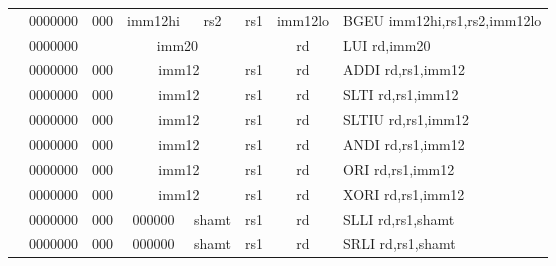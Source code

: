 \begin{table}[p]
\begin{small}
\begin{center}
\begin{tabular}{rcccccccccl}
&
\multicolumn{1}{|c|}{0000000} &
\multicolumn{2}{c|}{000} &
\multicolumn{3}{c|}{imm12hi} &
\multicolumn{1}{c|}{rs2} &
\multicolumn{1}{c|}{rs1} &
\multicolumn{1}{c|}{imm12lo} & BGEU imm12hi,rs1,rs2,imm12lo \\
\cline{2-10}
  

&
\multicolumn{1}{|c|}{0000000} &
\multicolumn{7}{c|}{imm20} &
\multicolumn{1}{c|}{rd} & LUI rd,imm20 \\
\cline{2-10}
  

&
\multicolumn{1}{|c|}{0000000} &
\multicolumn{2}{c|}{000} &
\multicolumn{4}{c|}{imm12} &
\multicolumn{1}{c|}{rs1} &
\multicolumn{1}{c|}{rd} & ADDI rd,rs1,imm12 \\
\cline{2-10}
  

&
\multicolumn{1}{|c|}{0000000} &
\multicolumn{2}{c|}{000} &
\multicolumn{4}{c|}{imm12} &
\multicolumn{1}{c|}{rs1} &
\multicolumn{1}{c|}{rd} & SLTI rd,rs1,imm12 \\
\cline{2-10}
  

&
\multicolumn{1}{|c|}{0000000} &
\multicolumn{2}{c|}{000} &
\multicolumn{4}{c|}{imm12} &
\multicolumn{1}{c|}{rs1} &
\multicolumn{1}{c|}{rd} & SLTIU rd,rs1,imm12 \\
\cline{2-10}
  

&
\multicolumn{1}{|c|}{0000000} &
\multicolumn{2}{c|}{000} &
\multicolumn{4}{c|}{imm12} &
\multicolumn{1}{c|}{rs1} &
\multicolumn{1}{c|}{rd} & ANDI rd,rs1,imm12 \\
\cline{2-10}
  

&
\multicolumn{1}{|c|}{0000000} &
\multicolumn{2}{c|}{000} &
\multicolumn{4}{c|}{imm12} &
\multicolumn{1}{c|}{rs1} &
\multicolumn{1}{c|}{rd} & ORI rd,rs1,imm12 \\
\cline{2-10}
  

&
\multicolumn{1}{|c|}{0000000} &
\multicolumn{2}{c|}{000} &
\multicolumn{4}{c|}{imm12} &
\multicolumn{1}{c|}{rs1} &
\multicolumn{1}{c|}{rd} & XORI rd,rs1,imm12 \\
\cline{2-10}
  

&
\multicolumn{1}{|c|}{0000000} &
\multicolumn{2}{c|}{000} &
\multicolumn{2}{c|}{000000} &
\multicolumn{2}{c|}{shamt} &
\multicolumn{1}{c|}{rs1} &
\multicolumn{1}{c|}{rd} & SLLI rd,rs1,shamt \\
\cline{2-10}
  

&
\multicolumn{1}{|c|}{0000000} &
\multicolumn{2}{c|}{000} &
\multicolumn{2}{c|}{000000} &
\multicolumn{2}{c|}{shamt} &
\multicolumn{1}{c|}{rs1} &
\multicolumn{1}{c|}{rd} & SRLI rd,rs1,shamt \\
\cline{2-10}
  


\end{tabular}
\end{center}
\end{small}
\end{table}
